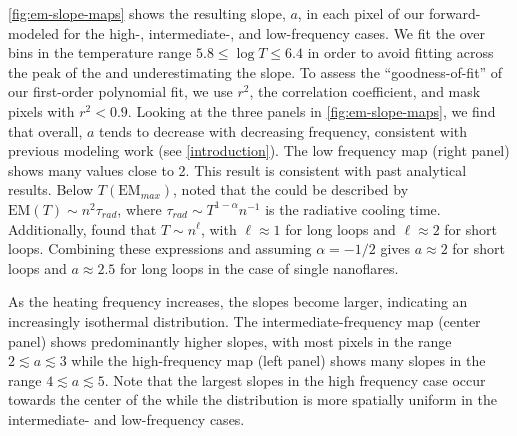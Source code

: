 \autoref{fig:em-slope-maps} shows the resulting \dem{} slope, $a$, in each pixel of our forward-modeled \AR{} for the high-, intermediate-, and low-frequency cases. We fit the \dem{} over bins in the temperature range $5.8\le\log T\le6.4$ in order to avoid fitting across the peak of the \dem{} and underestimating the slope. To assess the ``goodness-of-fit'' of our first-order polynomial fit, we use $r^2$, the correlation coefficient, and mask pixels with $r^2<0.9$. Looking at the three panels in \autoref{fig:em-slope-maps}, we find that overall, $a$ tends to decrease with decreasing frequency, consistent with previous modeling work (see \autoref{introduction}). The low frequency map (right panel) shows many values close to 2. This result is consistent with past analytical results. Below $T(\mathrm{EM}_{max})$, \citet{cargill_implications_1994} noted that the \dem{} could be described by $\mathrm{EM}(T)\sim n^2\tau_{rad}$, where $\tau_{rad}\sim T^{1-\alpha}n^{-1}$ is the radiative cooling time. Additionally, \citet{bradshaw_cooling_2010} found that $T\sim n^{\ell}$, with $\ell\approx1$ for long loops and $\ell\approx2$ for short loops. Combining these expressions and assuming $\alpha=-1/2$ \citep[i.e. using the radiative losses of][]{rosner_dynamics_1978} gives $a\approx2$ for short loops and $a\approx2.5$ for long loops in the case of single nanoflares. 

As the heating frequency increases, the slopes become larger, indicating an increasingly isothermal \dem{} distribution. The intermediate-frequency map (center panel) shows predominantly higher slopes, with most pixels in the range $2\lesssim a \lesssim 3$ while the high-frequency map (left panel) shows many slopes in the range $4\lesssim a\lesssim5$. Note that the largest slopes in the high frequency case occur towards the center of the \AR{} while the distribution is more spatially uniform in the intermediate- and low-frequency cases.

